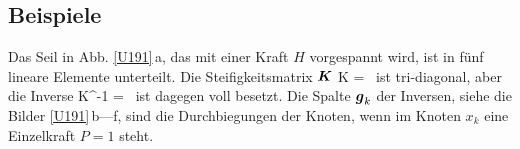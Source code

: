 {\textcolor{sectionTitleBlue}{\section{Beispiele}}}
Das Seil in Abb. \ref{U191}\,a, das mit einer Kraft $H$ vorgespannt wird, ist in f\"{u}nf lineare Elemente unterteilt. Die Steifigkeitsmatrix
$\mbox{\boldmath $K$}$
\beq
    \vek K = 
    \,
\eeq
ist tri-diagonal, aber die Inverse
\beq
   \vek K^{-1} = 
    \,
\eeq
ist dagegen voll besetzt. Die Spalte $\mbox{\boldmath $g$}_k$ der Inversen, siehe die Bilder \ref{U191}\,b---f, sind die Durchbiegungen der Knoten, wenn im Knoten $x_k$ eine Einzelkraft $P = 1$ steht.

